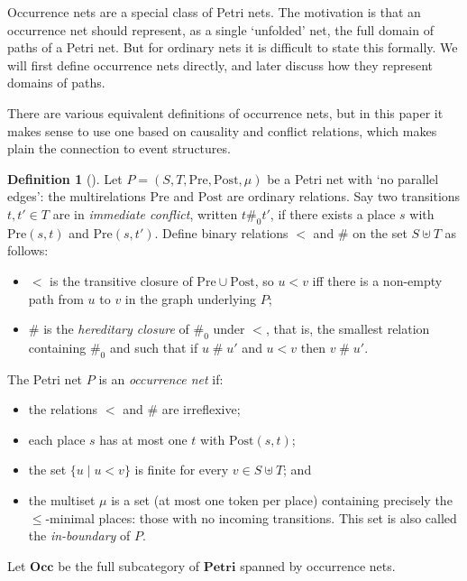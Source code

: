 \documentclass[11pt,a4paper]{article}
\theoremstyle{plain}
\theoremstyle{definition}
\newtheorem{definition}[theorem]{Definition}
\theoremstyle{remark}
\newcommand{\Occ}{\mathbf{Occ}}
\newcommand{\Petri}{\mathbf{Petri}}
\newcommand{\Pre}{\mathrm{Pre}}
\newcommand{\Post}{\mathrm{Post}}
\begin{document}
Occurrence nets are a special class of Petri nets. The motivation is that an occurrence net should represent, as a single `unfolded' net, the full domain of paths of a Petri net. But for ordinary nets it is difficult to state this formally. We will first define occurrence nets directly, and later discuss how they represent domains of paths. 

There are various equivalent definitions of occurrence nets, but in this paper it makes sense to use one based on causality and conflict relations, which makes plain the connection to event structures.
\begin{definition}[\cite{ES1}]
\label{def:occurrence-net}
  Let $P = (S, T, \Pre, \Post, \mu)$ be a Petri net with `no parallel edges': the multirelations $\Pre$ and $\Post$ are ordinary relations. Say two
  transitions $t, t' \in T$ are in \emph{immediate conflict}, written
  $t \mathbin{\#_0} t'$, if there exists a place $s$ with $\Pre(s, t)$ and
  $\Pre(s, t')$. Define binary relations $<$ and $\#$ on the set $S \uplus T$ as
  follows:
  \begin{itemize}
    \item $<$ is the transitive closure of  $\Pre \cup \Post$, so $u < v$ iff there is a non-empty path from $u$ to $v$ in the graph underlying $P$;
    \item $\#$ is the \emph{hereditary closure} of $\#_0$ under ${<}$, that is,
          the smallest relation containing $\#_0$ and such that if $u \mathbin{\#} u'$ and
          $u < v$ then $v \mathbin{\#} u'$.
        \end{itemize}
        The Petri net $P$ is an \emph{occurrence net} if: 
		\begin{itemize}
			\item the relations $<$ and
        $\#$ are irreflexive; 
		\item each place $s$ has at most one $t$ with $\Post(s, t)$;
		\item the set $\{ u \mid u < v \}$ is finite for every
        $v \in S \uplus T$; and
		\item the multiset $\mu$ is a set (at most one token
        per place) containing precisely the $\leq$-minimal places: those with no incoming transitions. This set is also called the \emph{in-boundary} of $P$. 
		\end{itemize}
  \end{definition}
Let $\Occ$ be the full subcategory of $\Petri$ spanned by occurrence nets. 
\end{document}
